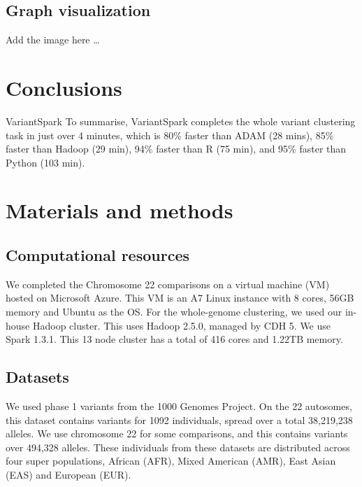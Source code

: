 \documentclass{bmcart}
\newcommand{\variantSpark}{{\sc VariantSpark}}
\begin{document}
\subsection*{Graph visualization}
Add the image here \ldots



\section*{Conclusions}
\variantSpark{} 
To summarise, \variantSpark{} completes the whole variant clustering task in just over 4 minutes, which is 80\% faster than ADAM (28 mins), 85\% faster than Hadoop (29 min), 94\% faster than R (75 min), and 95\% faster than Python (103 min).



\section*{Materials and methods}
\subsection*{Computational resources}
We completed the Chromosome 22 comparisons on a virtual machine (VM) hosted on Microsoft Azure. This VM is an A7 Linux instance with 8 cores, 56GB memory and Ubuntu as the OS. 
For the whole-genome clustering, we used our in-house Hadoop cluster. This uses Hadoop 2.5.0, managed by CDH 5. We use Spark 1.3.1. This 13 node cluster has a total of 416 cores and 1.22TB memory.


\subsection*{Datasets}
We used  phase 1 variants from the 1000 Genomes Project. On the 22 autosomes, this dataset contains variants for 1092 individuals, spread over a total 38,219,238 alleles.
We use chromosome 22 for some comparisons, and this contains variants over 494,328 alleles.
These individuals from these datasets are distributed across four super populations, African (AFR), Mixed American (AMR), East Asian (EAS) and European (EUR).
\end{document}
